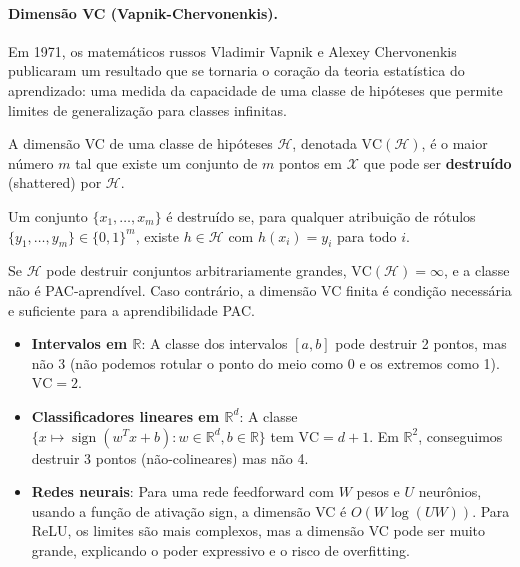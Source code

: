 \documentclass{tufte-handout}
\DeclareMathOperator{\sign}{sign}
\begin{document}
\paragraph{Dimensão VC (Vapnik-Chervonenkis).}

Em 1971, os matemáticos russos Vladimir Vapnik e Alexey Chervonenkis publicaram um resultado que se tornaria o coração da teoria estatística do aprendizado: uma medida da capacidade de uma classe de hipóteses que permite limites de generalização para classes infinitas.

\begin{defn}[Dimensão VC]
    A dimensão VC de uma classe de hipóteses $\mathcal{H}$, denotada $\text{VC}(\mathcal{H})$, é o maior número $m$ tal que existe um conjunto de $m$ pontos em $\mathcal{X}$ que pode ser \textbf{destruído} (shattered) por $\mathcal{H}$.

    Um conjunto $\{x_1, \dots, x_m\}$ é destruído se, para qualquer atribuição de rótulos $\{y_1, \dots, y_m\} \in \{0,1\}^m$, existe $h \in \mathcal{H}$ com $h(x_i) = y_i$ para todo $i$.
\end{defn}

Se $\mathcal{H}$ pode destruir conjuntos arbitrariamente grandes, $\text{VC}(\mathcal{H}) = \infty$, e a classe não é PAC-aprendível. Caso contrário, a dimensão VC finita é condição necessária e suficiente para a aprendibilidade PAC.

\begin{exmp}
    \hfill
    \begin{itemize}
        \item \textbf{Intervalos em $\mathbb{R}$}: A classe dos intervalos $[a,b]$ pode destruir 2 pontos, mas não 3 (não podemos rotular o ponto do meio como 0 e os extremos como 1). $\text{VC} = 2$.

        \item \textbf{Classificadores lineares em $\mathbb{R}^d$}: A classe $\{x \mapsto \sign(w^T x + b) : w \in \mathbb{R}^d, b \in \mathbb{R}\}$ tem $\text{VC} = d+1$. Em $\mathbb{R}^2$, conseguimos destruir 3 pontos (não-colineares) mas não 4.

        \item \textbf{Redes neurais}: Para uma rede feedforward com $W$ pesos e $U$ neurônios, usando a função de ativação sign, a dimensão VC é $O(W \log(UW))$. Para ReLU, os limites são mais complexos, mas a dimensão VC pode ser muito grande, explicando o poder expressivo e o risco de overfitting.
    \end{itemize}
\end{exmp}
\end{document}
